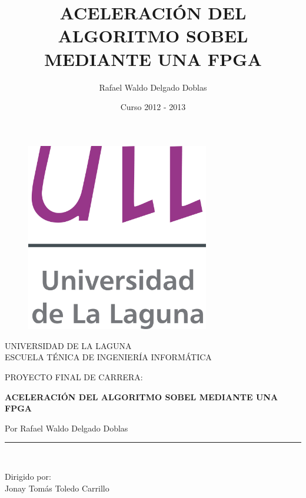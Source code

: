 \documentclass[a4paper,12pt,titlepage,final]{book}
\title{\Huge ACELERACIÓN DEL ALGORITMO SOBEL MEDIANTE UNA FPGA}
\author{Rafael Waldo Delgado Doblas}
\date{Curso 2012 - 2013}
\begin{document}
\frontmatter

\begin{titlepage}
\begin{center}
\vspace*{-1in}
\begin{figure}[htb]
\begin{center}
\includegraphics[width=8cm]{./figuras/Logo_ULL.png}
\end{center}
\end{figure}
UNIVERSIDAD DE LA LAGUNA\\
\vspace*{0.15in}
ESCUELA TÉNICA DE INGENIERÍA INFORMÁTICA\\
\vspace*{0.6in}
\begin{large}
PROYECTO FINAL DE CARRERA:\\
\end{large}
\vspace*{0.2in}
\begin{Large}
\textbf{ACELERACIÓN DEL ALGORITMO SOBEL MEDIANTE UNA FPGA} \\
\end{Large}
\vspace*{0.3in}
\begin{large}
Por Rafael Waldo Delgado Doblas\\
\end{large}
\vspace*{0.3in}
\rule{80mm}{0.1mm}\\
\vspace*{0.1in}
\begin{large}
Dirigido por: \\
Jonay Tomás Toledo Carrillo \\
\end{large}
\end{center}
\end{titlepage}
\end{document}
